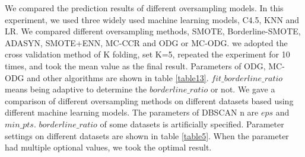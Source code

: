 \documentclass[ida]{iosart2x}
\begin{document}
We compared the prediction results of different oversampling models.
In this experiment, we used three widely used machine learning models, C4.5, KNN and LR.
We compared different oversampling methods, SMOTE, Borderline-SMOTE, ADASYN, SMOTE+ENN, MC-CCR 
and ODG or MC-ODG.
we adopted the cross validation method of K folding, 
set K=5, repeated the experiment for 10 times, 
and took the mean value as the final result.
Parameters of ODG, MC-ODG and other algorithms are shown in table \ref{table13}.
$fit\_borderline\_ratio$ means being 
adaptive to determine the $borderline\_ratio$ or not.
We gave a comparison of different oversampling methods on different 
datasets based using different machine learning models.  
The parameters of DBSCAN n are $eps$ and $min\_pts$.
$borderline\_ratio$ of some datasets is artificially specified.
Parameter settings on different datasets are shown in table \ref{table5}.
When the parameter had multiple optional values, we took the optimal result.
\end{document}
